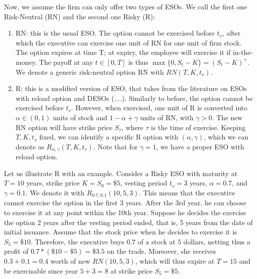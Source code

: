 Now, we assume the firm can only offer two types of ESOs. We call the first one Risk-Neutral (RN) and the second one Risky (R):
\begin{enumerate}
    \item RN: this is the usual ESO. The option cannot be exercised before $t_v$, after which the executive can exercise one unit of RN for one unit of firm stock. The option expires at time T; at expiry, the employee will exercise it if in-the-money. The payoff at any $t \in [0, T]$ is thus $\max \{0, S_t - K \} = (S_t - K)^+$. We denote a generic risk-neutral option RN with $RN (T, K, t_v)$.
    \item R: this is a modified version of ESO, that takes from the literature on ESOs with reload option and DESOs (....).
    Similarly to before, the option cannot be exercised before $t_v$. However, when exercised, one unit of R is converted into $\alpha \in (0,1)$ units of stock and $1 - \alpha + \gamma$ units of RN, with $\gamma > 0$. The new RN option will have strike price $S_\tau$, where $\tau$ is the time of exercise. Keeping $T, K, t_v$ fixed, we can identify a specific R option with $(\alpha, \gamma)$, which we can denote as $R_{\alpha, \gamma} (T, K, t_v)$. Note that for $\gamma = 1$, we have a proper ESO with reload option. %

\end{enumerate}
Let us illustrate R with an example. Consider a Risky ESO with maturity at $T=10$ years, strike price $K=S_0=\$5$, vesting period $t_v=3$ years, $\alpha = 0.7$, and $\gamma=0.1$. We denote it with $R_{0.7, 0.1} (10, 5, 3)$. This means that the executive cannot exercise the option in the first 3 years. After the 3rd year, he can choose to exercise it at any point within the 10th year. Suppose he decides the exercise the option 2 years after the vesting period ended, that is, 5 years from the date of initial issuance. Assume that the stock price when he decides to exercise it is $S_5 = \$10$. Therefore, the executive buys $0.7$ of a stock at $5$ dollars, netting thus a profit of $0.7*(\$10-\$5)=\$3.5$ on the trade. Moreover, she receives $0.3+0.1=0.4$ worth of new $RN(10, 5, 3)$, which will thus expire at $T=15$ and be exercisable since year $5+3=8$ at strike price $S_5=\$5$. 
